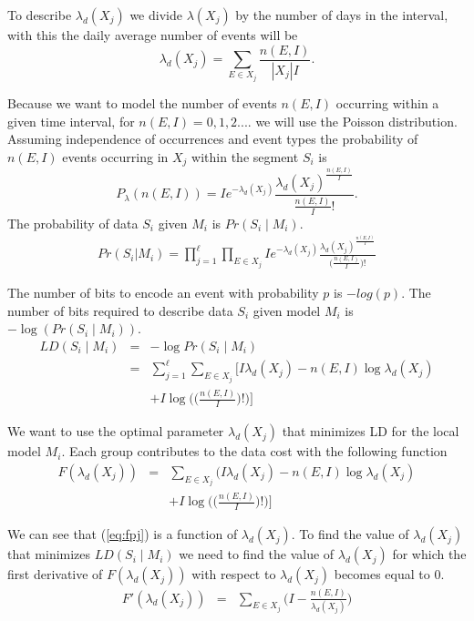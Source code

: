 To describe $\lambda_{d}(X_j)$ we divide $\lambda(X_j)$  by the number of days in the interval, with this the daily average number of events will be 
$$\lambda_{d}(X_j)=\sum_{E \in X_j}\frac{n(E,I)}{|X_j|I}.$$

Because we want to model the number of events $n(E,I)$ occurring within a given time interval, for $n(E,I)=0,1,2....$ we will use the Poisson distribution.
Assuming independence of occurrences and event types the probability of $n(E,I)$ events occurring in $X_j$ within the segment $S_i$ is $$P_{\lambda}(n(E,I))=I e^{-\lambda_{d}(X_j)}\frac{\lambda_{d}(X_j)^{\frac{n(E,I)}{I}}}{\frac{n(E,I)}{I}!}.$$ The probability of data $S_i$ given $M_i$ is $Pr(S_i\mid M_i)$. 
 \begin{eqnarray*}
    Pr(S_i|M_i)
     =\prod_{j=1}^{\ell}\prod_{E \in X_j} I e^{-\lambda_d(X_j)}\frac{\lambda_d(X_j)^{\frac{n(E,I)}{I}}}{\Big(\frac{n(E,I)}{I}\Big)!}
 \end{eqnarray*}
 
The number of bits to encode an event with probability $p$ is $-log(p)$. The number of bits required to describe data $S_i$ given model $M_i$ is $-\log(Pr(S_i\mid M_i))$. 
    \begin{eqnarray}
    LD(S_i\mid M_i)
  & = &
-\log{Pr(S_i\mid M_i)} \nonumber\\
  & = &
  \sum_{j=1}^{\ell}\sum_{E \in X_j}\Big[I \lambda_d(X_j)-n(E,I) \log \lambda_d(X_j) \nonumber \\
  &  &
   +I \log{\Big(\Big(\frac{n(E,I)}{I}\Big)!\Big)\Big]}
  \label{eq:ldcost}
  \end{eqnarray}
  
We want to use the optimal parameter $\lambda_d(X_j)$ that minimizes LD for the local model $M_i$. Each group contributes to the data cost with the following function
  \begin{eqnarray}
  F(\lambda_d(X_j))
   & = &
   \sum_{E \in X_j}\Big(I \lambda_d(X_j)-n(E,I) \log \lambda_d(X_j) \nonumber\\
   & &
   +I \log{\Big(\Big(\frac{n(E,I)}{I}\Big)!\Big)\Big]}
     \label{eq:fpj}
 \end{eqnarray}
 
We can see that (\ref{eq:fpj}) is a function of $\lambda_d(X_j)$. To find the value of $\lambda_d(X_j)$ that minimizes $LD(S_i\mid M_i)$ we need to find the value of $\lambda_d(X_j)$ for which the first derivative of $F(\lambda_d(X_j))$ with respect to $\lambda_d(X_j)$ becomes equal to 0.
  \begin{eqnarray*}
    F'(\lambda_d(X_j))
  & = &
  \sum_{E \in X_j}\Big(I- \frac{n(E,I)}{\lambda_d(X_j)}\Big)
  \end{eqnarray*}
  
